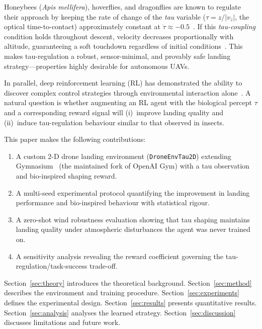\documentclass[10pt,twocolumn]{article}
\begin{document}
Honeybees (\emph{Apis mellifera}), hoverflies, and dragonflies are known to
regulate their approach by keeping the rate of change of the \emph{tau} variable
($\tau = z/|v_z|$, the optical time-to-contact) approximately constant at
$\dot{\tau} \approx -0.5$~\cite{lee1976,wagner1982}.
If this \emph{tau-coupling} condition holds throughout descent, velocity decreases
proportionally with altitude, guaranteeing a soft touchdown regardless of initial
conditions~\cite{lee1976}.
This makes tau-regulation a robust, sensor-minimal, and provably safe landing
strategy---properties highly desirable for autonomous UAVs.

In parallel, deep reinforcement learning (RL) has demonstrated the ability to
discover complex control strategies through environmental interaction
alone~\cite{schulman2017ppo}.
A natural question is whether augmenting an RL agent with the biological percept
$\tau$ and a corresponding reward signal will (i)~improve landing quality and
(ii)~induce tau-regulation behaviour similar to that observed in insects.

This paper makes the following contributions:
\begin{enumerate}[noitemsep,leftmargin=*]
  \item A custom 2-D drone landing environment (\texttt{DroneEnvTau2D}) extending
        Gymnasium~\cite{towers2024} (the maintained fork of OpenAI Gym)
        with a tau observation and
        bio-inspired shaping reward.
  \item A multi-seed experimental protocol quantifying the improvement in landing
        performance and bio-inspired behaviour with statistical rigour.
  \item A zero-shot wind robustness evaluation showing that tau shaping maintains
        landing quality under atmospheric disturbances the agent was never
        trained on.
  \item A sensitivity analysis revealing the reward coefficient governing the
        tau-regulation/task-success trade-off.
\end{enumerate}

Section~\ref{sec:theory} introduces the theoretical background.
Section~\ref{sec:method} describes the environment and training procedure.
Section~\ref{sec:experiments} defines the experimental design.
Section~\ref{sec:results} presents quantitative results.
Section~\ref{sec:analysis} analyses the learned strategy.
Section~\ref{sec:discussion} discusses limitations and future work.
\end{document}
